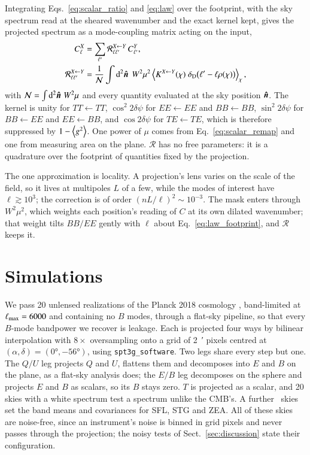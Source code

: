 \documentclass{aa}
\newcommand{\gsq}{\expval{g^2}}
\begin{document}
Integrating Eqs.~\eqref{eq:scalar_ratio} and \eqref{eq:law} over the footprint, with the sky spectrum read at the sheared wavenumber and the exact kernel kept, gives the projected spectrum as a mode-coupling matrix acting on the input,
\begin{equation} \label{eq:coupling}
\begin{aligned}
  C_\ell^{X} &= \sum_{\ell'} \mathcal{R}^{X \leftarrow Y}_{\ell\ell'}\, C^{Y}_{\ell'}, \\
  \mathcal{R}^{X \leftarrow Y}_{\ell\ell'} &= \frac{1}{\mathcal{N}} \int \dd[2]{\vu*{n}}\; W^2 \mu^2
    \expval{K^{X\leftarrow Y}(\chi)\; \delta_{\rm D}\qty(\ell' - \ell\rho(\chi))}_\chi,
\end{aligned}
\end{equation}
with $\mathcal{N} = \int \dd[2]{\vu*{n}}\, W^2 \mu$ and every quantity evaluated at the sky position $\vu*{n}$.
The kernel is unity for $TT \leftarrow TT$, $\cos^2 2\delta\psi$ for $EE \leftarrow EE$ and $BB \leftarrow BB$, $\sin^2 2\delta\psi$ for $BB \leftarrow EE$ and $EE \leftarrow BB$, and $\cos 2\delta\psi$ for $TE \leftarrow TE$, which is therefore suppressed by $1-\gsq$.
One power of $\mu$ comes from Eq.~\eqref{eq:scalar_remap} and one from measuring area on the plane.
$\mathcal{R}$ has no free parameters: it is a quadrature over the footprint of quantities fixed by the projection.

The one approximation is locality.
A projection's lens varies on the scale of the field, so it lives at multipoles $L$ of a few, while the modes of interest have $\ell \gtrsim 10^3$; the correction is of order $(nL/\ell)^2 \sim 10^{-3}$.
The mask enters through $W^2\mu^2$, which weights each position's reading of $C$ at its own dilated wavenumber; that weight tilts $BB/EE$ gently with $\ell$ about Eq.~\eqref{eq:law_footprint}, and $\mathcal{R}$ keeps it.

\section{Simulations} \label{sec:data}
\label{subsec:sims}

We pass 20 unlensed realizations of the Planck 2018 cosmology \citep{planck18}, band-limited at $\ell_{\rm max} = 6000$ and containing no $B$ modes, through a flat-sky pipeline, so that every $B$-mode bandpower we recover is leakage.
Each is projected four ways by bilinear interpolation with $8\times$ oversampling onto a grid of \SI{2}{\arcminute} pixels centred at $(\alpha,\delta) = (\ang{0}, \ang{-56})$, using \texttt{spt3g\_software}.
Two legs share every step but one.
The $Q/U$ leg projects $Q$ and $U$, flattens them and decomposes into $E$ and $B$ on the plane, as a flat-sky analysis does; the $E/B$ leg decomposes on the sphere and projects $E$ and $B$ as scalars, so its $B$ stays zero.
$T$ is projected as a scalar, and 20 skies with a white spectrum test a spectrum unlike the CMB's.
A further \covNumProjected\ skies set the band means and covariances for SFL, STG and ZEA.
All of these skies are noise-free, since an instrument's noise is binned in grid pixels and never passes through the projection; the noisy tests of Sect.~\ref{sec:discussion} state their configuration.
\end{document}
